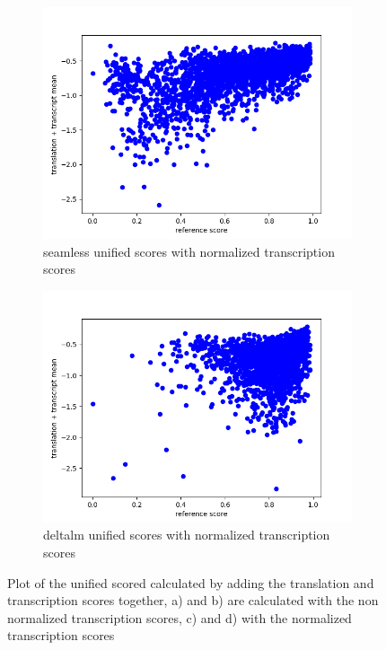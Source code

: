 \begin{figure}[ht]
\begin{subfigure}{0.4\textwidth}
        \includegraphics[width=\linewidth]{Latex/sections/images/seamlesstranscripttranslationmean.png}
        \caption{seamless unified scores with normalized transcription scores}
    \end{subfigure}
    \begin{subfigure}{0.4\textwidth}
        \includegraphics[width=\linewidth]{Latex/sections/images/dlmtranscripttranslationmean.png}
        \caption{deltalm unified scores with normalized transcription scores}
    \end{subfigure}
    \caption{Plot of the unified scored calculated by adding the translation and transcription scores together, a) and b) are calculated with the non normalized transcription scores, c) and d) with the normalized transcription scores}
    \label{fig:uniscore add plot}
\end{figure}



